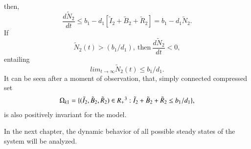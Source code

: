 then,
\begin{equation*}\frac{d \tilde N_2}{dt} \leq b_1 - d_1[ \tilde I_2 + \tilde B_2 + \tilde R_2] = b_1 - d_1 \tilde N_2. \end{equation*}
If \begin{equation*} \tilde N_2(t) > (b_1/d_1), \ \mbox{then} \ \frac{d \tilde N_2}{d t} < 0,\end{equation*} entailing \begin{equation*}lim_{t \rightarrow \infty} \tilde N_2(t)\leq b_1/d_1 .\end{equation*}
It can be seen after a moment of observation, that, simply connected compressed set
\begin{equation}\Omega_{k1} = \{( \tilde I_2, \tilde B_2, \tilde R_2) \in R_+ \textsuperscript{3} : \tilde I_2 + \tilde B_2 + \tilde R_2 \leq b_1/d_1 \},\end{equation}
is also positively invariant for the model.

\par In the next chapter, the dynamic behavior of all possible steady states of the system will be analyzed. 